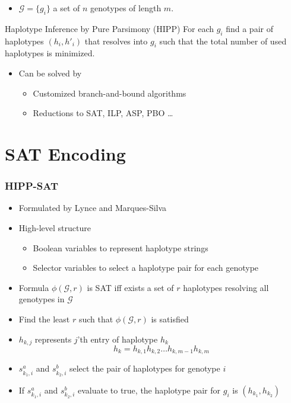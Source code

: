 \documentclass[handout]{beamer}
\begin{document}
\begin{frame}
\begin{itemize}
\item $\mathcal{G} = \{g_i\}$ a set of $n$ genotypes of length $m$.
\end{itemize}
\begin{block}{Haplotype Inference by Pure Parsimony (HIPP)}
For each $g_i$ find a pair of haplotypes $(h_i, h'_i)$ that resolves into $g_i$ such that the total number of used haplotypes is minimized.
\end{block}
\begin{itemize}
\item Can be solved by 
\begin{itemize}
\item Customized branch-and-bound algorithms
\item Reductions to SAT, ILP, ASP, PBO \dots
\end{itemize}
\end{itemize}
\end{frame}

\section{SAT Encoding}

\begin{frame}
\frametitle{HIPP-SAT}
\begin{itemize}
\item Formulated by Lynce and Marques-Silva~\cite{DBLP:conf/aaai/LynceM06}
\item High-level structure
\begin{itemize}
\item Boolean variables to represent haplotype strings
\item Selector variables to select a haplotype pair for each genotype
\end{itemize}
\item Formula $\phi (\mathcal{G}, r)$ is SAT iff exists a set of $r$ haplotypes resolving all genotypes in $\mathcal{G}$
\item Find the least $r$ such that $\phi (\mathcal{G}, r)$ is satisfied
\end{itemize}
\end{frame}

\begin{frame}
\begin{itemize}
\item $h_{k,j}$ represents $j$'th entry of haplotype $h_k$
$$ h_k = h_{k,1} h_{k,2} \dots h_{k,m-1} h_{k,m} $$
\item $s^a_{k_1,i}$ and $s^b_{k_2, i}$ select the pair of haplotypes for genotype $i$
\item If $s^a_{k_1,i}$ and $s^b_{k_2, i}$ evaluate to true, the haplotype pair for $g_i$ is $(h_{k_1}, h_{k_2})$
\end{itemize}
\end{frame}
\end{document}
